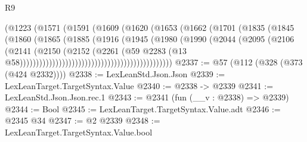 \begin{lexlean}{R9}
\begin{coremodule}
                                              (@1223
                                                (@1571
                                                  (@1591
                                                    (@1609
                                                      (@1620
                                                        (@1653
                                                          (@1662
                                                            (@1701
                                                              (@1835
                                                                (@1845
                                                                  (@1860
                                                                    (@1865
                                                                      (@1885
                                                                        (@1916
                                                                          (@1945
                                                                            (@1980
                                                                              (@1990
                                                                                (@2044
                                                                                  (@2095
                                                                                    (@2106
                                                                                      (@2141
                                                                                        (@2150
                                                                                          (@2152
                                                                                            (@2261
                                                                                              (@59
                                                                                                @2283
                                                                                                (@13
                                                                                                  @58)))))))))))))))))))))))))))))))))))))))))))))))
@2337 := @57 (@112 (@328 (@373 (@424 @2332))))
@2338 := LexLeanStd.Json.Json
@2339 := LexLeanTarget.TargetSyntax.Value
@2340 := @2338 -> @2339
@2341 := LexLeanStd.Json.Json.rec.{1}
@2343 := @2341 (fun (__v : @2338) => @2339)
@2344 := Bool
@2345 := LexLeanTarget.TargetSyntax.Value.adt
@2346 := @2345 @34
@2347 := @2 @2339
@2348 := LexLeanTarget.TargetSyntax.Value.bool

\end{coremodule}
\end{lexlean}
